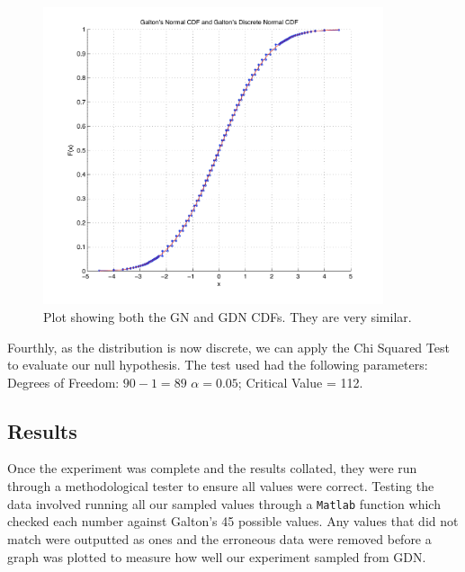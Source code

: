 \begin{figure}[thp]
\begin{center}
\includegraphics[width=10cm]{figures/GaltonDice_Normal_CDF_and_Galtons_Discrete_Normal_CDF.pdf}
\caption{Plot showing both the GN and GDN CDFs. They are very similar.}
\end{center}
\end{figure}
 

Fourthly, as the distribution is now discrete, we can apply the Chi Squared Test to evaluate our null hypothesis. The test used had the following parameters:
Degrees of Freedom: $90 -1 = 89$ 
 $\alpha = 0.05$;
Critical Value = 112.

\subsection{Results}
Once the experiment was complete and the results collated, they were run through a methodological tester to ensure all values were correct. Testing the data involved running all our sampled values through a {\tt Matlab} function which checked each number against Galton's 45 possible values. Any values that did not match were outputted as ones and the erroneous data were removed before a graph was plotted to measure how well our experiment sampled from GDN. 

